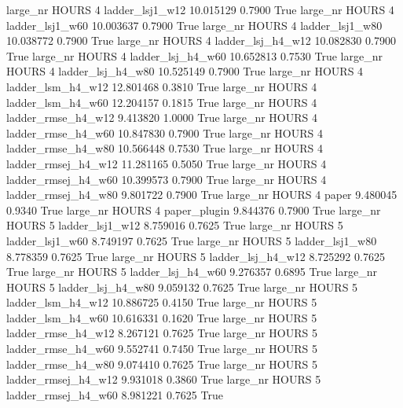   large_nr    HOURS                 4     ladder_lsj1_w12   10.015129      0.7900    True
  large_nr    HOURS                 4     ladder_lsj1_w60   10.003637      0.7900    True
  large_nr    HOURS                 4     ladder_lsj1_w80   10.038772      0.7900    True
  large_nr    HOURS                 4   ladder_lsj_h4_w12   10.082830      0.7900    True
  large_nr    HOURS                 4   ladder_lsj_h4_w60   10.652813      0.7530    True
  large_nr    HOURS                 4   ladder_lsj_h4_w80   10.525149      0.7900    True
  large_nr    HOURS                 4   ladder_lsm_h4_w12   12.801468      0.3810    True
  large_nr    HOURS                 4   ladder_lsm_h4_w60   12.204157      0.1815    True
  large_nr    HOURS                 4  ladder_rmse_h4_w12    9.413820      1.0000    True
  large_nr    HOURS                 4  ladder_rmse_h4_w60   10.847830      0.7900    True
  large_nr    HOURS                 4  ladder_rmse_h4_w80   10.566448      0.7530    True
  large_nr    HOURS                 4 ladder_rmsej_h4_w12   11.281165      0.5050    True
  large_nr    HOURS                 4 ladder_rmsej_h4_w60   10.399573      0.7900    True
  large_nr    HOURS                 4 ladder_rmsej_h4_w80    9.801722      0.7900    True
  large_nr    HOURS                 4               paper    9.480045      0.9340    True
  large_nr    HOURS                 4        paper_plugin    9.844376      0.7900    True
  large_nr    HOURS                 5     ladder_lsj1_w12    8.759016      0.7625    True
  large_nr    HOURS                 5     ladder_lsj1_w60    8.749197      0.7625    True
  large_nr    HOURS                 5     ladder_lsj1_w80    8.778359      0.7625    True
  large_nr    HOURS                 5   ladder_lsj_h4_w12    8.725292      0.7625    True
  large_nr    HOURS                 5   ladder_lsj_h4_w60    9.276357      0.6895    True
  large_nr    HOURS                 5   ladder_lsj_h4_w80    9.059132      0.7625    True
  large_nr    HOURS                 5   ladder_lsm_h4_w12   10.886725      0.4150    True
  large_nr    HOURS                 5   ladder_lsm_h4_w60   10.616331      0.1620    True
  large_nr    HOURS                 5  ladder_rmse_h4_w12    8.267121      0.7625    True
  large_nr    HOURS                 5  ladder_rmse_h4_w60    9.552741      0.7450    True
  large_nr    HOURS                 5  ladder_rmse_h4_w80    9.074410      0.7625    True
  large_nr    HOURS                 5 ladder_rmsej_h4_w12    9.931018      0.3860    True
  large_nr    HOURS                 5 ladder_rmsej_h4_w60    8.981221      0.7625    True
